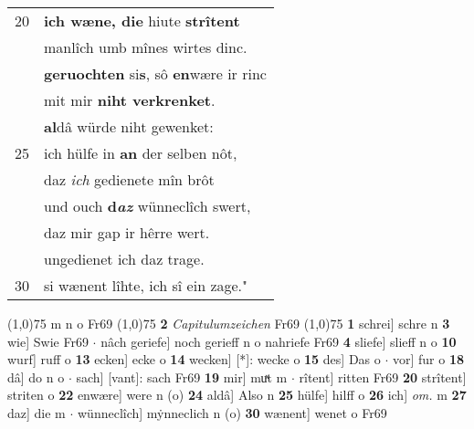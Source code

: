 \documentclass[8pt,a4paper,notitlepage]{article}
\begin{document}
\begin{table}[ht]
\begin{minipage}[t]{0.5\linewidth}
\begin{tabular}{rl}
20 & \textbf{ich wæne, die} hiute \textbf{strîtent}\\ 
 & manlîch umb mînes wirtes dinc.\\ 
 & \textbf{geruochten} si\textbf{s}, sô \textbf{en}wære ir rinc\\ 
 & mit mir \textbf{niht verkrenket}.\\ 
 & \textbf{al}dâ würde niht gewenket:\\ 
25 & ich hülfe in \textbf{an} der selben nôt,\\ 
 & daz \textit{ich} gedienete mîn brôt\\ 
 & und ouch \textbf{d\textit{az}} wünneclîch swert,\\ 
 & daz mir gap ir hêrre wert.\\ 
 & ungedienet ich daz trage.\\ 
30 & si wænent lîhte, ich sî ein zage."\\ 
\end{tabular}
\scriptsize
\line(1,0){75} \newline
m n o Fr69 \newline
\line(1,0){75} \newline
\textbf{2} \textit{Capitulumzeichen} Fr69  \newline
\line(1,0){75} \newline
\textbf{1} schrei] schre n \textbf{3} wie] Swie Fr69  $\cdot$ nâch geriefe] noch gerieff n o nahriefe Fr69 \textbf{4} sliefe] slieff n o \textbf{10} wurf] ruff o \textbf{13} ecken] ecke o \textbf{14} wecken] [*]: wecke o \textbf{15} des] Das o  $\cdot$ vor] fur o \textbf{18} dâ] do n o  $\cdot$ sach] [vant]: sach Fr69 \textbf{19} mir] muͯt m  $\cdot$ rîtent] ritten Fr69 \textbf{20} strîtent] striten o \textbf{22} enwære] were n (o) \textbf{24} aldâ] Also n \textbf{25} hülfe] hilff o \textbf{26} ich] \textit{om.} m \textbf{27} daz] die m  $\cdot$ wünneclîch] mẏnneclich n (o) \textbf{30} wænent] wenet o Fr69 \newline
\end{minipage}
\end{table}
\newpage
\end{document}
